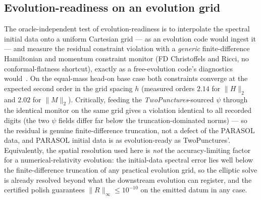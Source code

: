 \documentclass[
  aps,
  prd,
  twocolumn,
  amsmath,
  amssymb,
  nofootinbib,
  superscriptaddress,
  floatfix,
]{revtex4-2}
\begin{document}
\subsection{Evolution-readiness on an evolution grid}
\label{sec:validation:constraints}

The oracle-independent test of evolution-readiness is to interpolate the spectral
initial data onto a uniform Cartesian grid --- as an evolution code would ingest it
--- and measure the residual constraint violation with a \emph{generic}
finite-difference Hamiltonian and momentum constraint monitor (FD Christoffels and
Ricci, no conformal-flatness shortcut), exactly as a free-evolution code's
diagnostics would~\cite{BaumgarteShapiro2010}. On the equal-mass head-on base
case both constraints converge at the expected second order in the grid spacing
$h$ (measured orders $2.14$ for $\|H\|_2$ and $2.02$ for $\|M\|_2$). Critically,
feeding the \emph{TwoPunctures}-sourced $\psi$ through
the identical monitor on the same grid gives a violation identical to all recorded
digits (the two $\psi$ fields differ far below the truncation-dominated norms) ---
so the residual is genuine finite-difference truncation, not a defect of the
PARASOL data, and PARASOL initial data is as evolution-ready as TwoPunctures'.
Equivalently, the spatial resolution used here is \emph{not} the accuracy-limiting
factor for a numerical-relativity evolution: the initial-data spectral error lies
well below the finite-difference truncation of any practical evolution grid, so the
elliptic solve is already resolved beyond what the downstream evolution can
register, and the certified polish guarantees $\|R\|_\infty\le10^{-10}$ on the
emitted datum in any case.



\end{document}
